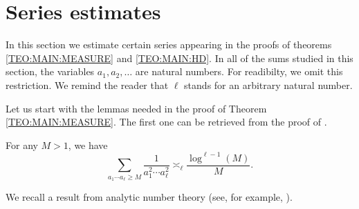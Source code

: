 \documentclass[12pt,a4paper]{amsart}
\begin{document}
\section{Series estimates}\label{Section:Series}
In this section we estimate certain series appearing in the proofs of theorems \ref{TEO:MAIN:MEASURE} and \ref{TEO:MAIN:HD}.
In all of the sums studied in this section, the variables $a_1,a_2,\ldots$ are natural numbers. For readibilty, we omit this restriction. We remind the reader that $\ell$ stands for an arbitrary natural number.

Let us start with the lemmas needed in the proof of Theorem \ref{TEO:MAIN:MEASURE}. The first one can be retrieved from the proof of \cite[Theorem 1.5]{HuangWuXu2020}.
\begin{lem01}
For any $M>1$, we have
\begin{equation}\label{Eq:Series:01}
\sum_{a_1\cdots a_{\ell}\geq M }
\frac{1}{a_1^2\cdots a_{\ell}^2} 
\asymp_{\ell}
\frac{\log^{\ell-1}(M)}{M}.
\end{equation}
\end{lem01}

We recall a result from analytic number theory (see, for example, \cite[Section 4]{HardyLittlewood1923}).
\end{document}
